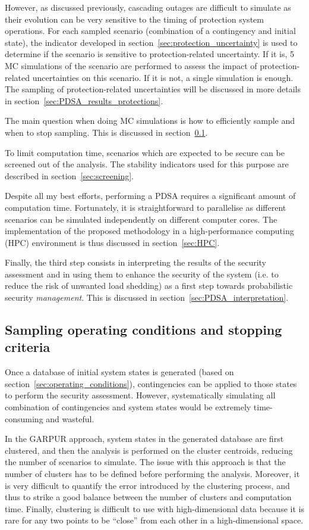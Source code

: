 However, as discussed previously, cascading outages are difficult to simulate as their evolution can be very sensitive to the timing of protection system operations. For each sampled scenario (combination of a contingency and initial state), the indicator developed in section~\ref{sec:protection_uncertainty} is used to determine if the scenario is sensitive to protection-related uncertainty. If it is, 5 MC simulations of the scenario are performed to assess the impact of protection-related uncertainties on this scenario. If it is not, a single simulation is enough. The sampling of protection-related uncertainties will be discussed in more details in section~\ref{sec:PDSA_results_protections}.

The main question when doing MC simulations is how to efficiently sample and when to stop sampling. This is discussed in section~\ref{sec:sampling}.

To limit computation time, scenarios which are expected to be secure can be screened out of the analysis. The stability indicators used for this purpose are described in section~\ref{sec:screening}.

Despite all my best efforts, performing a PDSA requires a significant amount of computation time. Fortunately, it is straightforward to parallelise as different scenarios can be simulated independently on different computer cores. The implementation of the proposed methodology in a high-performance computing (HPC) environment is thus discussed in section~\ref{sec:HPC}.


Finally, the third step consists in interpreting the results of the security assessment and in using them to enhance the security of the system (i.e. to reduce the risk of unwanted load shedding) as a first step towards probabilistic security \emph{management}. This is discussed in section~\ref{sec:PDSA_interpretation}.


\subsection{Sampling operating conditions and stopping criteria}
\label{sec:sampling}

Once a database of initial system states is generated (based on section~\ref{sec:operating_conditions}), contingencies can be applied to those states to perform the security assessment. However, systematically simulating all combination of contingencies and system states would be extremely time-consuming and wasteful.

In the GARPUR approach, system states in the generated database are first clustered, and then the analysis is performed on the cluster centroids, reducing the number of scenarios to simulate. The issue with this approach is that the number of clusters has to be defined before performing the analysis. Moreover, it is very difficult to quantify the error introduced by the clustering process, and thus to strike a good balance between the number of clusters and computation time. Finally, clustering is difficult to use with high-dimensional data because it is rare for any two points to be ``close'' from each other in a high-dimensional space.

